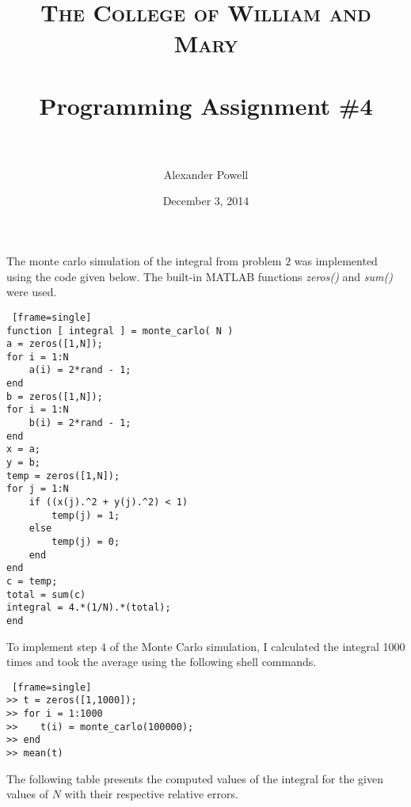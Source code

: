 \documentclass[paper=a4, fontsize=11pt]{scrartcl} %
\title{	
\normalfont \normalsize 
\textsc{The College of William and Mary} \\ [25pt] %
\horrule{0.5pt} \\[0.4cm] %
\huge Programming Assignment \#4 \\ %
\horrule{2pt} \\[0.5cm] %
}
\author{Alexander Powell} %
\date{\normalsize December 3, 2014} %
\numberwithin{equation}{section} %
\numberwithin{figure}{section} %
\numberwithin{table}{section} %
\begin{document}
\lstset{language=MATLAB}

\maketitle %


\section{}






\section{}

The monte carlo simulation of the integral from problem $2$ was implemented using the code given below.  The built-in MATLAB functions \textit{zeros()} and \textit{sum()} were used.  





\begin{lstlisting} [frame=single]
function [ integral ] = monte_carlo( N )
a = zeros([1,N]);
for i = 1:N  
    a(i) = 2*rand - 1;
end
b = zeros([1,N]);
for i = 1:N  
    b(i) = 2*rand - 1;
end
x = a;
y = b;
temp = zeros([1,N]);
for j = 1:N
    if ((x(j).^2 + y(j).^2) < 1)
        temp(j) = 1;
    else
        temp(j) = 0;
    end
end
c = temp;
total = sum(c)
integral = 4.*(1/N).*(total);
end
\end{lstlisting}

To implement step $4$ of the Monte Carlo simulation, I calculated the integral 1000 times and took the average using the following shell commands.  

\begin{lstlisting} [frame=single]
>> t = zeros([1,1000]);
>> for i = 1:1000
>>    t(i) = monte_carlo(100000);
>> end
>> mean(t)
\end{lstlisting}


The following table presents the computed values of the integral for the given values of $N$ with their respective relative errors.  
\end{document}
